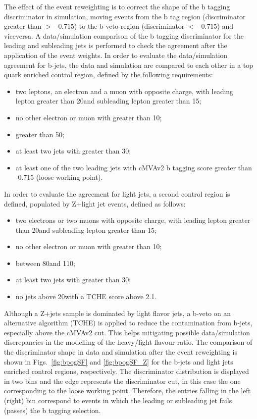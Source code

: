 The effect of the event reweighting is to correct the shape of the b tagging discriminator in simulation, moving events from the b tag region (discriminator greater than $> -0.715$) to the b veto region (discriminator $ < -0.715$) and viceversa. A data/simulation comparison of the b tagging discriminator for the leading and subleading jets is performed to check the agreement after the application of the event weights. In order to evaluate the data/simulation agreement for b-jets, the data and simulation are compared to each other in a top quark enriched control region, defined by the following requirements:
\begin{itemize}
\item two leptons, an electron and a muon with opposite charge, with
leading lepton \pt greater than 20\GeV and subleading lepton \pt greater than 15\GeV;
\item no other electron or muon with \pt greater than 10\GeV;
\item \mll greater than 50\GeV;
\item at least two jets with \pt greater than 30\GeV;
\item at least one of the two leading jets with cMVAv2 b tagging score
greater than -0.715 (loose working point).
\end{itemize}
In order to evaluate the agreement for light jets, a second
control region is defined, populated by Z+light jet events, defined as follows:
\begin{itemize}
\item two electrons or two muons with opposite charge, with
leading lepton \pt greater than 20\GeV and subleading lepton \pt greater than 15\GeV;
\item no other electron or muon with \pt greater than 10\GeV;
\item \mll between 80\GeV and 110\GeV;
\item at least two jets with \pt greater than 30\GeV;
\item no jets above 20\GeV with a TCHE score above 2.1. 
\end{itemize}
Although a Z+jets sample is dominated by light flavor jets, a b-veto on an
alternative algorithm (TCHE) is applied to reduce the contamination from b-jets,
especially above the cMVAv2 cut. This helps mitigating possible data/simulation discrepancies in the modelling of the heavy/light flavour ratio.
The comparison of the discriminator shape in data and simulation after the event reweighting is shown in Figs.~\ref{fig:bpogSF} and \ref{fig:bpogSF_Z} for the b-jets and light jets enriched control regions, respectively. The discriminator distribution is displayed in two bins and the edge represents the discriminator cut, in this case the one corresponding to the loose working point. Therefore, the entries falling in the left (right) bin correspond to events in which the leading or subleading jet fails (passes) the b tagging selection.

